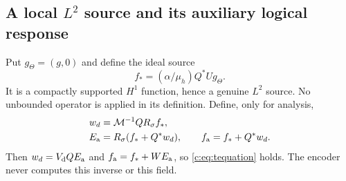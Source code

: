 \subsection{\texorpdfstring{A local $L^2$ source and its auxiliary logical response}{A local L2 source and its auxiliary logical response}}
Put $g_\Theta=(g,0)$ and define the ideal source
\begin{equation}
 f_*=(\alpha/\mu_h)Q^*Ug_\Theta.                          \label{c:eq:idealsource}
\end{equation}
It is a compactly supported $H^1$ function, hence a genuine $L^2$ source.
No unbounded operator is applied in its definition. Define, only for
analysis,
\begin{align}
 w_d&=\mathcal M^{-1}QR_\sigma f_*,\\
 E_{\rm a}&=R_\sigma(f_*+Q^*w_d),\qquad
 f_{\rm a}=f_*+Q^*w_d.                                      \label{c:eq:auxsolution}
\end{align}
Then $w_d=V_{\rm d}QE_{\rm a}$ and $f_{\rm a}=f_*+WE_{\rm a}$, so
\eqref{c:eq:tequation} holds. The encoder never computes this inverse or
this field.

